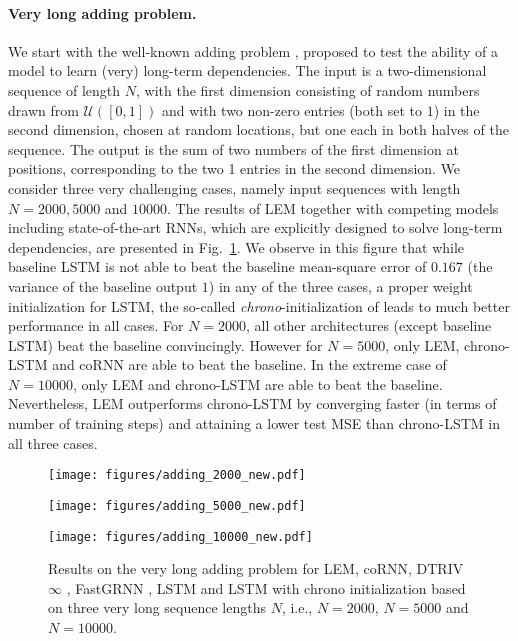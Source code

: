 \documentclass{article} \usepackage{iclr2022_conference,times}
\newcommand{\fref}[1] {Fig.~\ref{#1}}
\begin{document}
\paragraph{Very long adding problem.}
We start with the well-known adding problem \citep{lstm}, proposed to test the ability of a model to learn (very) long-term dependencies. The input is a two-dimensional sequence of length $N$, with the first dimension consisting of random numbers drawn from $\mathcal{U}([0,1])$ and with two non-zero entries (both set to $1$) in the second dimension, chosen at random locations, but one each in both halves of the sequence. The output is the sum of two numbers of the first dimension at positions, corresponding to the two 1 entries in the second dimension. We consider three very challenging cases, namely input sequences with length $N=2000,5000$ and $10000$. The results of LEM together with competing models including state-of-the-art RNNs, which are explicitly designed to solve long-term dependencies, are presented in \fref{fig:adding_results}. We observe in this figure that while baseline LSTM is not able to beat the baseline mean-square error of $0.167$ (the variance of the baseline output $1$) in any of the three cases, a proper weight initialization for LSTM, the so-called \emph{chrono}-initialization of \cite{warp} leads to much better performance in all cases. For $N=2000$, all other architectures (except baseline LSTM) beat the baseline convincingly. However for $N=5000$, only LEM, chrono-LSTM and coRNN are able to beat the baseline. In the extreme case of $N=10000$, only LEM and chrono-LSTM are able to beat the baseline. Nevertheless, LEM outperforms chrono-LSTM by converging faster (in terms of number of training steps) and attaining a lower test MSE than chrono-LSTM in all three cases. 
\begin{figure}[ht!]
\begin{minipage}{.33\textwidth}
\texttt{[image: figures/adding\_2000\_new.pdf]}
\end{minipage}\begin{minipage}{.33\textwidth}
\texttt{[image: figures/adding\_5000\_new.pdf]}
\end{minipage}\begin{minipage}{.33\textwidth}
\texttt{[image: figures/adding\_10000\_new.pdf]}
\end{minipage}
\caption{Results on the very long adding problem for LEM, coRNN, DTRIV$\infty$ \citep{dtriv}, FastGRNN \citep{fastrnn}, LSTM and LSTM with chrono initialization \citep{warp} based on three very long sequence lengths $N$, i.e., $N=2000$, $N=5000$ and $N=10000$.}
\label{fig:adding_results}
\end{figure}
\end{document}
